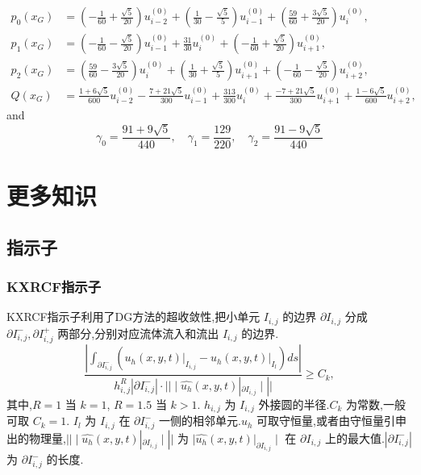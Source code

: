 \documentclass{book}
\begin{document}
\begin{equation}
    \begin{aligned}
        p_{0}\left(x_{G}\right) & =\left(-\frac{1}{60}+\frac{\sqrt{5}}{20}\right) u_{i-2}^{(0)}+\left(\frac{1}{30}-\frac{\sqrt{5}}{5}\right) u_{i-1}^{(0)}+\left(\frac{59}{60}+\frac{3 \sqrt{5}}{20}\right) u_{i}^{(0)},       \\
        p_{1}\left(x_{G}\right) & =\left(-\frac{1}{60}-\frac{\sqrt{5}}{20}\right) u_{i-1}^{(0)}+\frac{31}{30} u_{i}^{(0)}+\left(-\frac{1}{60}+\frac{\sqrt{5}}{20}\right) u_{i+1}^{(0)},                                        \\
        p_{2}\left(x_{G}\right) & =\left(\frac{59}{60}-\frac{3 \sqrt{5}}{20}\right) u_{i}^{(0)}+\left(\frac{1}{30}+\frac{\sqrt{5}}{5}\right) u_{i+1}^{(0)}+\left(-\frac{1}{60}-\frac{\sqrt{5}}{20}\right) u_{i+2}^{(0)},       \\
        Q\left(x_{G}\right)     & =\frac{1+6 \sqrt{5}}{600} u_{i-2}^{(0)}-\frac{7+21 \sqrt{5}}{300} u_{i-1}^{(0)}+\frac{313}{300} u_{i}^{(0)}+\frac{-7+21 \sqrt{5}}{300} u_{i+1}^{(0)}+\frac{1-6 \sqrt{5}}{600} u_{i+2}^{(0)},
    \end{aligned}
\end{equation}
and
\begin{equation}
    \gamma_{0}=\frac{91+9 \sqrt{5}}{440}, \quad \gamma_{1}=\frac{129}{220}, \quad \gamma_{2}=\frac{91-9 \sqrt{5}}{440}
\end{equation}



\chapter{更多知识}
\section{指示子}
\subsection{KXRCF指示子}
KXRCF指示子利用了DG方法的超收敛性\cite{RN92},把小单元 $I_{i,j}$ 的边界 $\partial I_{i,j}$ 分成 $\partial I_{i,j}^-,\partial I_{i,j}^+$ 两部分,分别对应流体流入和流出 $I_{i,j}$ 的边界.
\begin{equation}
    \frac{\left|\int_{\partial I_{i, j}^{-}}\left(\left.u_{h}(x, y, t)\right|_{I_{i, j}}-\left.u_{h}(x, y, t)\right|_{I_{l}}\right) d s\right|}{h_{i, j}^{R}\left|\partial I_{i, j}^{-}\right| \cdot||\mid \widehat{u_{h}}(x, y, t)|_{\partial I_{i, j}}\mid||} \geq C_{k},
\end{equation}
其中,$R=1$ 当 $k=1$, $R=1.5$ 当 $k>1$. $h_{i,j}$ 为 $I_{i,j}$ 外接圆的半径.$C_k$ 为常数,一般可取 $C_k = 1$. $I_l$ 为 $I_{i,j}$ 在 $\partial I_{i,j}^-$ 一侧的相邻单元.$u_h$ 可取守恒量,或者由守恒量引申出的物理量,$||\mid \widehat{u_{h}}(x, y, t)|_{\partial I_{i, j}}\mid||$ 为 $\mid \widehat{u_{h}}(x, y, t)|_{\partial I_{i, j}}\mid$ 在 $\partial I_{i,j}$ 上的最大值.$|\partial I_{i,j}^-|$ 为 $\partial I_{i,j}^-$ 的长度.
\end{document}
